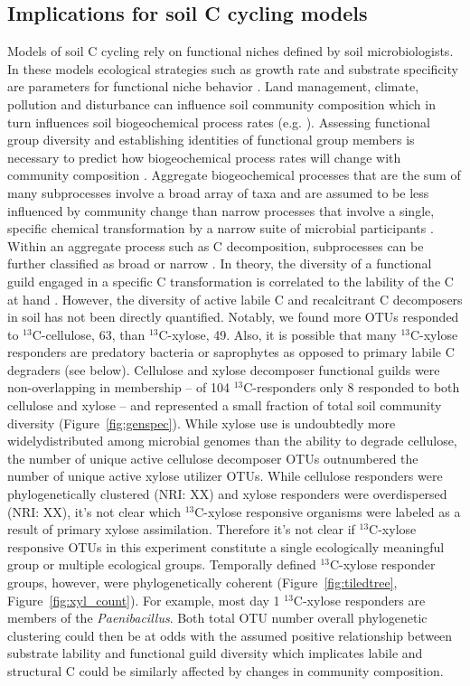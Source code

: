 \subsection{Implications for soil C cycling models}
Models of soil C cycling rely on functional niches defined by soil
microbiologists. In these models ecological strategies such as growth rate
and substrate specificity are parameters for functional niche behavior
\citep{Kaiser2014a}. Land management, climate, pollution and disturbance can
influence soil community composition \citep{McGuire2010} which in turn
influences soil biogeochemical process rates (e.g. \citep{Berlemont2014a}).
Assessing functional group diversity and establishing identities of
functional group members is necessary to predict how biogeochemical process
rates will change with community composition
\citep{Schimel_1995,McGuire2010}. Aggregate biogeochemical processes that are
the sum of many subprocesses involve a broad array of taxa and are assumed to
be less influenced by community change than narrow processes that involve
a single, specific chemical transformation by a narrow suite of microbial
participants \citep{Schimel_1995,McGuire2010}. Within an aggregate process
such as C decomposition, subprocesses can be further classified as broad or
narrow \citep{McGuire2010}. In theory, the diversity of a functional guild
engaged in a specific C transformation is correlated to the lability of the
C at hand  \citep{McGuire2010}. However, the diversity of active labile C and
recalcitrant C decomposers in soil has not been directly quantified. Notably,
we found more OTUs responded to $^{13}$C-cellulose, 63, than $^{13}$C-xylose,
49. Also, it is possible that many $^{13}$C-xylose responders are predatory
bacteria or saprophytes as opposed to primary labile C degraders (see below).
Cellulose and xylose decomposer functional guilds were non-overlapping in
membership -- of 104 $^{13}$C-responders only 8 responded to both cellulose
and xylose -- and represented a small fraction of total soil community
diversity (Figure~\ref{fig:genspec}). While xylose use is undoubtedly more
widelydistributed among microbial genomes than the ability to degrade
cellulose, the number of unique active cellulose decomposer OTUs outnumbered
the number of unique active xylose utilizer OTUs. While cellulose responders
were phylogenetically clustered (NRI: XX) and xylose responders were
overdispersed (NRI: XX), it's not clear which $^{13}$C-xylose responsive
organisms were labeled as a result of primary xylose assimilation.
Therefore it's not clear if $^{13}$C-xylose responsive OTUs in this
experiment constitute a single ecologically meaningful group or multiple
ecological groups. Temporally defined $^{13}$C-xylose responder groups,
however, were phylogenetically coherent (Figure~\ref{fig:tiledtree},
Figure~\ref{fig:xyl_count}). For example, most day 1 $^{13}$C-xylose
responders are members of the \textit{Paenibacillus}. Both total OTU number
overall phylogenetic clustering could then be at odds with the assumed positive
relationship between substrate lability and functional guild diversity which
implicates labile and structural C could be similarly affected by changes in
community composition. 

